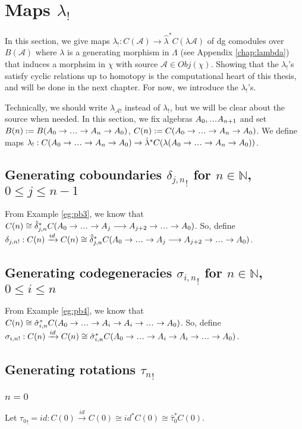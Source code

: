\section{Maps $\lambda_!$}
\label{sec:shriek_maps}
In this section, 
we give maps $\lambda_!: 
C(\mathcal{A}) \to 
\hat{\lambda}^*C(\lambda \mathcal{A})$ 
of dg comodules 
over $B(\mathcal{A})$ where 
$\lambda$ is a generating morphism 
in $\Lambda$ (see Appendix \ref{chap:lambda}) 
that induces a morphsim in $\chi$ 
with source $\mathcal{A} \in Obj(\chi)$. 
Showing that the 
$\lambda_!$'s satisfy cyclic relations 
up to homotopy is the 
computational heart of this thesis, 
and will be done in the next chapter. 
For now, we introduce the $\lambda_!$'s.

Technically, we should write 
$\lambda_{\mathcal{A}!}$ instead of 
$\lambda_!$, but we will be clear 
about the source when needed. 
In this section, we 
fix algebras $A_0, \smdots A_{n+1}$ and set 
$B(n) := B(A_0 \to \smdots \to A_n \to A_0)$, 
$C(n) := C(A_0 \to \smdots \to A_n \to A_0)$. 
We define maps $\lambda_!: 
C(A_0 \to \smdots \to A_n \to A_0) \to 
\hat{\lambda}^*C(\lambda(A_0 \to 
\smdots \to A_n \to A_0))$.
%
\subsection{Generating coboundaries 
  ${\delta_{j,n}}_!$ for $n \in \mathbb{N}$, 
  $0 \leq j \leq n-1$}
From Example \ref{eg:pb3}, we know that $C(n) \cong 
\hat{\delta}_{j,n}^*C(A_0 \to \smdots \to A_j 
\longrightarrow A_{j+2} \to \smdots \to A_0)$. 
So, define
$\delta_{j,n!}:C(n)
\xrightarrow{id} C(n) \cong 
\hat{\delta}_{j,n}^*C(A_0 \to \smdots \to A_j 
\longrightarrow A_{j+2} \to \smdots \to A_0)$.
%
\subsection{Generating codegeneracies 
  ${\sigma_{i,n}}_!$ for $n \in \mathbb{N}$, 
  $0 \leq i \leq n$}
From Example \ref{eg:pb4}, we know that $C(n) 
\cong \hat{\sigma}_{i,n}^*C(A_0 \to \smdots \to A_i 
\to A_i \to \smdots \to A_0)$. 
So, define
$\sigma_{i,n!}:C(n)
\xrightarrow{id} C(n) \cong 
\hat{\sigma}_{i,n}^*C(A_0 \to \smdots \to A_i 
\to A_i \to \smdots \to A_0)$.
%
\subsection{Generating rotations ${\tau_n}_!$}
\subsubsection{$n=0$}
Let ${\tau_0}_! = id: C(0) 
\xrightarrow{id} C(0) \cong 
id^*C(0) \cong \hat{\tau}_0^*C(0)$.
%
